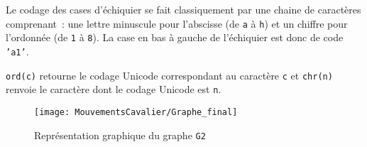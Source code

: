 
Le codage des cases d'échiquier se fait classiquement par une chaine de caractères comprenant~: une lettre minuscule pour l'abscisse (de \texttt{a} à \texttt{h}) et un chiffre pour l'ordonnée (de \texttt{1} à \texttt{8}). La case en bas à gauche de l'échiquier est donc de code \texttt{'a1'}.

\begin{remarque}
	\texttt{ord(c)} retourne le codage Unicode correspondant au caractère \texttt{c} et \texttt{chr(n)} renvoie le caractère dont le codage Unicode est \texttt{n}. 
\end{remarque} 





\begin{figure}[h]
	\begin{center}
		\texttt{[image: MouvementsCavalier/Graphe\_final]}
	\end{center}
	\caption{Représentation graphique du graphe \texttt{G2}}
\end{figure}








